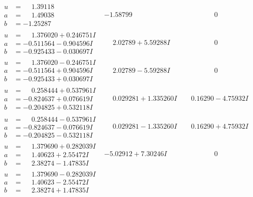 \documentclass[1p]{elsarticle_modified}
\theoremstyle{definition}
\begin{document}
$$\begin{array}{c|c|c}
\begin{aligned}
u &= \phantom{-}1.39118\phantom{ +0.000000I} \\
a &= \phantom{-}1.49038\phantom{ +0.000000I} \\
b &= -1.25287\phantom{ +0.000000I}\end{aligned}
 & -1.58799\phantom{ +0.000000I} & \phantom{-0.000000 } 0 \\ \hline\begin{aligned}
u &= \phantom{-}1.376020 + 0.246751 I \\
a &= -0.511564 - 0.904596 I \\
b &= -0.925433 - 0.030697 I\end{aligned}
 & \phantom{-}2.02789 + 5.59288 I & \phantom{-0.000000 } 0 \\ \hline\begin{aligned}
u &= \phantom{-}1.376020 - 0.246751 I \\
a &= -0.511564 + 0.904596 I \\
b &= -0.925433 + 0.030697 I\end{aligned}
 & \phantom{-}2.02789 - 5.59288 I & \phantom{-0.000000 } 0 \\ \hline\begin{aligned}
u &= \phantom{-}0.258444 + 0.537961 I \\
a &= -0.824637 + 0.076619 I \\
b &= -0.204825 + 0.532118 I\end{aligned}
 & \phantom{-}0.029281 + 1.335260 I & \phantom{-}0.16290 - 4.75932 I \\ \hline\begin{aligned}
u &= \phantom{-}0.258444 - 0.537961 I \\
a &= -0.824637 - 0.076619 I \\
b &= -0.204825 - 0.532118 I\end{aligned}
 & \phantom{-}0.029281 - 1.335260 I & \phantom{-}0.16290 + 4.75932 I \\ \hline\begin{aligned}
u &= \phantom{-}1.379690 + 0.282039 I \\
a &= \phantom{-}1.40623 + 2.55472 I \\
b &= \phantom{-}2.38274 - 1.47835 I\end{aligned}
 & -5.02912 + 7.30246 I & \phantom{-0.000000 } 0 \\ \hline\begin{aligned}
u &= \phantom{-}1.379690 - 0.282039 I \\
a &= \phantom{-}1.40623 - 2.55472 I \\
b &= \phantom{-}2.38274 + 1.47835 I\end{aligned}

\end{array}$$
\end{document}
